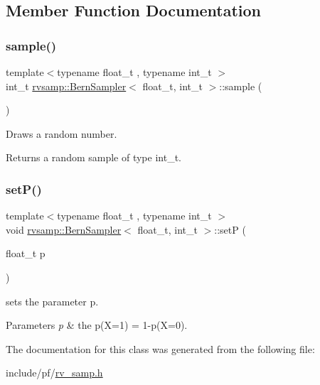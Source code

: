 \subsection{Member Function Documentation}
\mbox{\label{classrvsamp_1_1BernSampler_a2520daff5a896b58073d6756758d1323}} 
\subsubsection{\texorpdfstring{sample()}{sample()}}
{\footnotesize\ttfamily template$<$typename float\+\_\+t , typename int\+\_\+t $>$ \\
int\+\_\+t \hyperlink{classrvsamp_1_1BernSampler}{rvsamp\+::\+Bern\+Sampler}$<$ float\+\_\+t, int\+\_\+t $>$\+::sample (\begin{DoxyParamCaption}{ }\end{DoxyParamCaption})}



Draws a random number. 

\begin{DoxyReturn}{Returns}
a random sample of type int\+\_\+t. 
\end{DoxyReturn}
\mbox{\label{classrvsamp_1_1BernSampler_a1cd648e7141ee9b3a50f67256601a140}} 
\subsubsection{\texorpdfstring{set\+P()}{setP()}}
{\footnotesize\ttfamily template$<$typename float\+\_\+t , typename int\+\_\+t $>$ \\
void \hyperlink{classrvsamp_1_1BernSampler}{rvsamp\+::\+Bern\+Sampler}$<$ float\+\_\+t, int\+\_\+t $>$\+::setP (\begin{DoxyParamCaption}\item[{float\+\_\+t}]{p }\end{DoxyParamCaption})}



sets the parameter p. 


\begin{DoxyParams}{Parameters}
{\em p} & the p(X=1) = 1-\/p(X=0). \\
\hline
\end{DoxyParams}


The documentation for this class was generated from the following file\+:\begin{DoxyCompactItemize}
\item 
include/pf/\hyperlink{rv__samp_8h}{rv\+\_\+samp.\+h}\end{DoxyCompactItemize}
